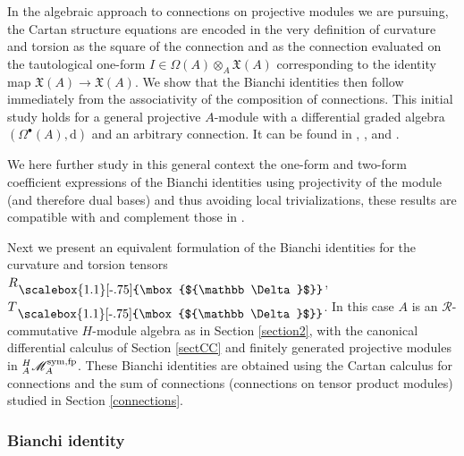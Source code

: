 \documentclass[12pt]{article}
\numberwithin{equation}{section}
\theoremstyle{plain}
\theoremstyle{definition}
\theoremstyle{remark}
\def\Vect{\mathfrak{X}}
\def\oA{\otimes_A}
\def\dd{\mathrm{d}}
\def\MMM{\mathscr{M}}
\def\AA{A}
\def\dd{{\nabla}}
\def\sym{{\rm{sym}}}
\def\dd{\mathrm{d}}
\def\catfp{{{}^H_\AA\MMM_\AA^{\sym, \rm{fp}}}}
\def\pstd{{}^{\phantom{J}}_{\raisebox{\depth}{\scalebox{1.1}[-.75]{\mbox{${\mathbb
            \Delta}$}}}}}
\def\stdd{\phantom{\!\!\!\dd}\pstd}
\begin{document}
In the algebraic approach to connections on projective modules we are pursuing, the Cartan structure equations are encoded in the very definition of curvature and torsion as the square of the connection and as the connection evaluated on the tautological one-form $I\in \Omega(A)\oA\Vect(A)$ corresponding to the identity map $\Vect(A)\to \Vect(A)$. We show that the Bianchi identities then follow immediately from the associativity of the composition of connections.  This initial study holds for a general projective $A$-module with a differential graded algebra $(\Omega^\bullet(A), \dd)$ and an arbitrary connection. It can be found in \cite[Part II, \S 2]{Connes}, \cite[\S 7 \& 8]{Landi},  \cite{QB_BM} and \cite[\S 4]{BM}.

We here further study in this general context the one-form and two-form coefficient expressions of the Bianchi identities using projectivity of the module (and therefore dual bases) and thus avoiding local trivializations, these results are compatible with and complement those in \cite[\S 5.2]{LC}.


Next we present an equivalent formulation of the Bianchi identities for the curvature and torsion tensors $R\stdd$, $T\stdd$.
In this case  $A$ is an  ${\mathcal{R}}$-commutative $H$-module algebra as in Section \ref{section2}, with the canonical differential calculus of Section \ref{sectCC} and finitely generated projective modules in $\catfp$. These Bianchi identities are obtained using the Cartan calculus for connections and the sum of connections (connections on tensor product modules) studied in Section \ref{connections}.

\subsubsection*{Bianchi identity}
\end{document}
